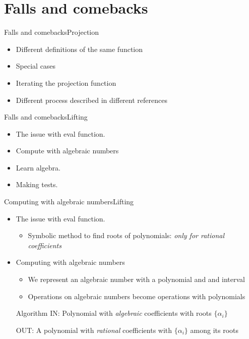\documentclass{beamer}
\begin{document}
\section{Falls and comebacks}
\begin{frame}{Falls and comebacks}{Projection}
    \begin{itemize}
        \item Different definitions of the same function
        \item Special cases
        \item Iterating the projection function
        \item Different process described in different references
    \end{itemize}
\end{frame}


\begin{frame}{Falls and comebacks}{Lifting}
    \begin{itemize}
        \item The issue with eval function.
        \item Compute with algebraic numbers
        \item Learn algebra.
        \item Making tests.
    \end{itemize}
\end{frame}

\begin{frame}{Computing with algebraic numbers}{Lifting}
    \begin{itemize}
        \item The issue with eval function.
        \begin{itemize}
        \item Symbolic method to find roots of polynomials: \emph{only for rational coefficients}
        \end{itemize}
        \item Computing with algebraic numbers
        \begin{itemize}
        \item We represent an algebraic number with a polynomial and and interval
        \item Operations on algebraic numbers become operations with polynomials        
        \end{itemize}
		\begin{exampleblock}{Algorithm}
        IN: Polynomial with \emph{algebraic} coefficients with roots $\{\alpha_i\}$
        
        OUT: A polynomial with \emph{rational} coefficients with $\{\alpha_i\}$ among its roots
        \end{exampleblock}
    \end{itemize}
\end{frame}
\end{document}
